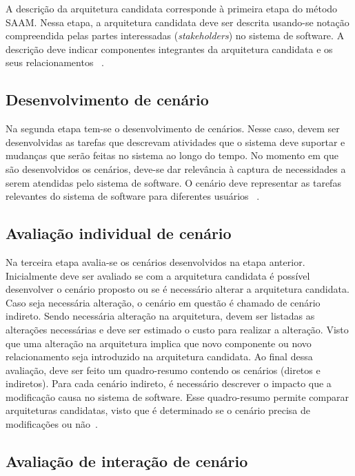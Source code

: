 A descrição da arquitetura candidata corresponde à primeira etapa do método SAAM. Nessa etapa, a arquitetura candidata deve ser descrita usando-se notação compreendida pelas partes interessadas (\emph{stakeholders}) no sistema de software. A descrição deve indicar componentes integrantes da arquitetura candidata e os seus relacionamentos ~\cite{scenario_methods}.

\subsection{Desenvolvimento de cenário}

Na segunda etapa tem-se o desenvolvimento de cenários. Nesse caso, devem ser desenvolvidas as tarefas que descrevam atividades que o sistema deve suportar e mudanças que serão feitas no sistema ao longo do tempo. No momento em que são desenvolvidos os cenários, deve-se dar relevância à captura de necessidades a serem atendidas pelo sistema de software. O cenário deve representar as tarefas relevantes do sistema de software para diferentes usuários ~\cite{scenario_methods}. 
\subsection{Avaliação individual de cenário}


Na terceira etapa  avalia-se os cenários desenvolvidos na etapa anterior. Inicialmente deve ser avaliado se com a arquitetura candidata é possível desenvolver o cenário proposto ou se é necessário alterar a arquitetura candidata. Caso seja necessária alteração, o cenário em questão é chamado de cenário indireto. Sendo necessária alteração na arquitetura, devem ser listadas as alterações necessárias e deve ser estimado o custo para realizar a alteração. Visto que uma alteração na arquitetura implica que novo componente ou novo relacionamento seja introduzido na arquitetura candidata. Ao final dessa avaliação, deve ser feito um quadro-resumo contendo os cenários (diretos e indiretos). Para cada cenário indireto, é necessário descrever o impacto que a modificação causa no sistema de software. Esse quadro-resumo permite comparar arquiteturas candidatas, visto que é determinado se o cenário precisa de modificações ou não~\cite{scenario_methods}.

\subsection{Avaliação de interação de cenário}

